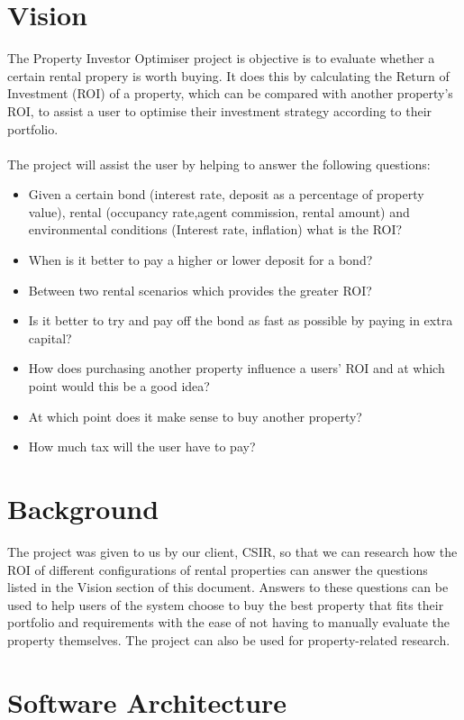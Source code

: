 \documentclass[a4paper,12pt]{article}
\begin{document}
\section{Vision}
The Property Investor Optimiser project is objective is to evaluate whether a certain rental propery is worth buying. It does this by calculating the Return of Investment (ROI) of a property, which can be compared with another property's ROI, to assist a user to optimise their investment strategy according to their portfolio.\\\\
The project will assist the user by helping to answer the following questions:\begin{itemize}
	\item Given a certain bond (interest rate, deposit as a percentage of property value), rental (occupancy rate,agent commission, 		rental amount) and environmental conditions (Interest rate, inflation) what is the ROI?
	\item When is it better to pay a higher or lower deposit for a bond?
	\item Between two rental scenarios which provides the greater ROI?
	\item Is it better to try and pay off the bond as fast as possible by paying in extra capital?
	\item How does purchasing another property influence a users’ ROI and at which point would this be a good idea?
	\item At which point does it make sense to buy another property?
	\item How much tax will the user have to pay?

\end{itemize}
\newpage
\section{Background}
The project was given to us by our client, CSIR, so that we can research how the ROI of different configurations of rental properties can answer the questions listed in the Vision section of this document. Answers to these questions can be used to help users of the system choose to buy the best property that fits their portfolio and requirements with the ease of not having to manually evaluate the property themselves. The project can also be used for property-related research.


\newpage
\section{Software Architecture}
\end{document}
